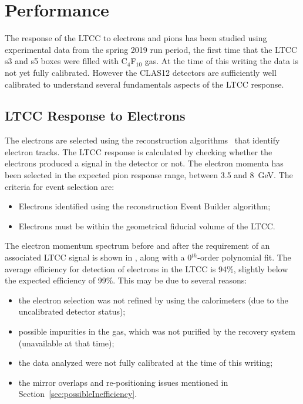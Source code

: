 \section{Performance}

The response of the LTCC to electrons and pions has been studied using experimental data from the spring 2019
run period, the first time that the LTCC s3 and s5 boxes were filled with C$_4$F$_{10}$ gas. At the time of this
writing the data is not yet fully calibrated. However the CLAS12 detectors are sufficiently well calibrated to
understand several fundamentals aspects of the LTCC response.

\subsection{LTCC Response to Electrons}
\label{sec:elecResponse}

The electrons are selected using the reconstruction algorithms~\cite{recon-nim} that identify electron tracks. The
LTCC response is calculated by checking whether the electrons produced a signal in the detector or not. The electron
momenta has been selected in the expected pion response range, between 3.5 and 8~GeV. The criteria for event
selection are:

\begin{itemize}
\item  Electrons identified using the reconstruction Event Builder algorithm;
\item Electrons must be within the geometrical fiducial volume of the LTCC.
\end{itemize}


The electron momentum spectrum before and after the requirement of an associated LTCC signal is shown in
, along with a 0$^{th}$-order polynomial fit. The average efficiency for detection of
electrons in the LTCC is 94$\%$, slightly below the expected efficiency of 99$\%$. This may be due to
several reasons:

\begin{itemize}
\item the electron selection was not refined by using the calorimeters (due to the uncalibrated detector status);
\item possible impurities in the gas, which was not purified by the recovery system (unavailable at that time);
\item the data analyzed were not fully calibrated at the time of this writing;
\item the mirror overlaps and re-positioning issues mentioned in Section~\ref{sec:possibleInefficiency}.
\end{itemize}

